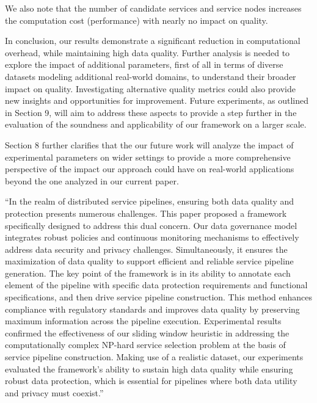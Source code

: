 {\begin{adjustwidth}{10pt}{10pt}
{We also note that the number of candidate services and service nodes increases the computation cost (performance) with nearly no impact on quality.

  In conclusion, our results demonstrate a significant reduction in computational overhead, while
  maintaining high data quality. Further analysis is needed to explore the impact of additional parameters, first of all in terms of diverse datasets modeling additional real-world domains, to understand their broader impact on quality. Investigating alternative quality metrics could also provide new insights and opportunities for improvement. Future experiments, as outlined in Section 9, will aim to address these aspects to provide a step further in the evaluation of the soundness and applicability of our framework on a larger scale.
}
\end{adjustwidth}

    \vspace{0.5em}
    
Section 8 further clarifies that the our future work will analyze the impact of experimental parameters on wider settings to provide a more comprehensive perspective of the impact our approach could have on real-world applications beyond the one analyzed in our current paper.

 \begin{adjustwidth}{10pt}{10pt}
        ``{\color{OurColor}In the realm of distributed service pipelines, ensuring both data quality and protection presents numerous challenges. This paper proposed a framework specifically designed to address this dual concern. Our data governance model integrates robust policies and continuous monitoring mechanisms to effectively address data security and privacy challenges. Simultaneously, it ensures the maximization of data quality to support efficient and reliable service pipeline generation. The key point of the framework is in its ability to annotate each element of the pipeline with specific data protection requirements and functional specifications, and then drive service pipeline construction. This method enhances compliance with regulatory standards and improves data quality by preserving maximum information across the pipeline execution. Experimental results confirmed the effectiveness of our sliding window heuristic in addressing the computationally complex NP-hard service selection problem at the basis of service pipeline construction. Making use of a realistic dataset, our experiments evaluated the framework's ability to sustain high data quality while ensuring robust data protection, which is essential for pipelines where both data utility and privacy must coexist.}''
    \end{adjustwidth}

~}

